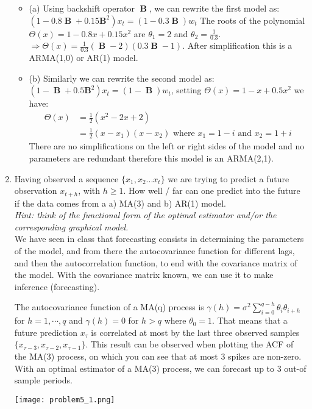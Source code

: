 \documentclass{article}
\DeclareMathOperator*{\B}{\textbf{B}}
\newcommand{\bi}{\begin{itemize}}
\newcommand{\ei}{\end{itemize}}
\newcommand{\0}{\mat{0}}
\newenvironment{solution}{\vspace{.25cm}\noindent{\it Solution:}}{}
\begin{document}
\begin{enumerate}
\begin{solution}
	\bi
		\item[(a)] Using backshift operator $\B$, we can rewrite the first model as:
		$(1 - 0.8 \B + 0.15 \textbf{B}^{2}) x_t = (1 -0.3 \B) w_t$
		The roots of the polynomial $\Theta(x) = 1 - 0.8 x + 0.15 x^2$ are $\theta_1 =2$ and $\theta_2=\frac{1}{0.3}$.
		$\Rightarrow \Theta(x) = \frac{1}{0.3} (\B-2) (0.3 \B-1)$. After simplification this is a ARMA(1,0) or AR(1) model.

		\item[(b)] Similarly we can rewrite the second model as:
		$(1-\B + 0.5 \textbf{B}^2) x_t = (1-\B) w_t$, setting $\Theta(x) = 1 -x + 0.5 x^2$ we have:
		\begin{align*}
			\Theta(x)  &= \frac{1}{2} (x^2 -2 x +2) \\
					&= \frac{1}{2}  (x -x_1) (x-x_2) \text{ where } x_1 = 1 -i \text{ and } x_2 = 1+ i
		\end{align*}		
		There are no simplifications on the left or right sides of the model and no parameters are redundant therefore this model is an ARMA(2,1).
		
	\ei
	
	\item  Having observed a sequence  $\{x_1,x_2... x_t \}$ we are trying to predict a future observation $x_{t+h}$, with $h\geq1$.
	How well / far can one predict into the future if the data comes from a a) MA(3) and b) AR(1) model. \\
	\emph{Hint: think of the functional form of the optimal estimator and/or the corresponding graphical model.}\\

	We have seen in class that forecasting consists in determining the parameters of the model, and from there the autocovariance function 
	for different lags, and then the autocorrelation function, to end with the covariance matrix of the model. 
	With the covariance matrix known, we can use it to make inference (forecasting).
	
	The autocovariance function of  a MA(q) process is $\gamma(h) = \sigma^2 \sum_{i=0}^{q-h} \theta_i \theta_{i+h}$ for $h=1,\cdots,q$ and $\gamma(h)=0$ for $h>q$
	where $\theta_0=1$. That means that a future prediction $x_{\tau}$ is correlated at most by the last three observed samples $\{ x_{\tau-3}, x_{\tau-2}, x_{\tau-1} \}$. 
	This result can be observed when plotting the ACF of the MA(3) process, on which you can see that at most 3 spikes are non-zero. With an optimal estimator of a MA(3) process, we
	can forecast up to 3 out-of sample periods.
	\begin{center}
		\texttt{[image: problem5\_1.png]} 
	\end{center}
	

\end{solution}
\end{enumerate}
\end{document}
